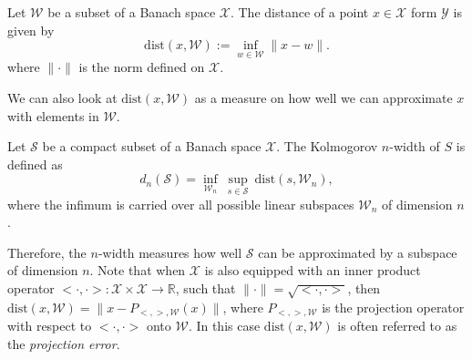 \begin{definition} \label{def:3.1}
Let $\mathcal W$ be a subset of a Banach space $\mathcal X$. The distance of a point $x\in \mathcal X$ form $\mathcal Y$ is given by
\begin{equation}  \label{eq:3.3}
	\text{dist}(x,\mathcal W) := \inf_{w\in \mathcal W} \| x-w \|.
\end{equation}
where $\|\cdot\|$ is the norm defined on $\mathcal X$.
\end{definition}
We can also look at $\text{dist}(x,\mathcal W)$ as a measure on how well we can approximate $x$ with elements in $\mathcal W$.
\begin{definition} \label{def:3.2}
Let $\mathcal S$ be a compact subset of a Banach space $\mathcal X$. The Kolmogorov $n$-width of $S$ is defined as
\begin{equation} \label{eq:3.4}
	d_n(\mathcal S) = \inf_{\mathcal W_n} \ \sup_{s\in \mathcal S} \ \text{dist}(s, \mathcal W_n),
\end{equation}
where the infimum is carried over all possible linear subspaces $\mathcal W_n$ of dimension $n$.
\end{definition}
Therefore, the $n$-width measures how well $\mathcal S$ can be approximated by a subspace of dimension $n$. Note that when $\mathcal X$ is also equipped with an inner product operator $<\cdot , \cdot> :\mathcal X \times \mathcal X \to \mathbb R $, such that $\| \cdot \| = \sqrt{<\cdot , \cdot>}$, then $\text{dist}(x,\mathcal W) = \| x - P_{<,>,\mathcal W}(x) \|$, where $P_{<,>,\mathcal W}$ is the projection operator with respect to $<\cdot,\cdot>$ onto $\mathcal W$. In this case $\text{dist}(x,\mathcal W)$ is often referred to as the \emph{projection error}.

